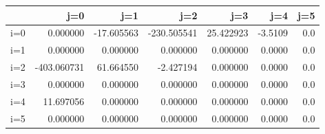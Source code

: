 \begin{tabular}{lrrrrrr}
\toprule
{} &         j=0 &        j=1 &         j=2 &        j=3 &     j=4 &  j=5 \\
\midrule
i=0 &    0.000000 & -17.605563 & -230.505541 &  25.422923 & -3.5109 &  0.0 \\
i=1 &    0.000000 &   0.000000 &    0.000000 &   0.000000 &  0.0000 &  0.0 \\
i=2 & -403.060731 &  61.664550 &   -2.427194 &   0.000000 &  0.0000 &  0.0 \\
i=3 &    0.000000 &   0.000000 &    0.000000 &   0.000000 &  0.0000 &  0.0 \\
i=4 &   11.697056 &   0.000000 &    0.000000 &   0.000000 &  0.0000 &  0.0 \\
i=5 &    0.000000 &   0.000000 &    0.000000 &   0.000000 &  0.0000 &  0.0 \\
\bottomrule
\end{tabular}
